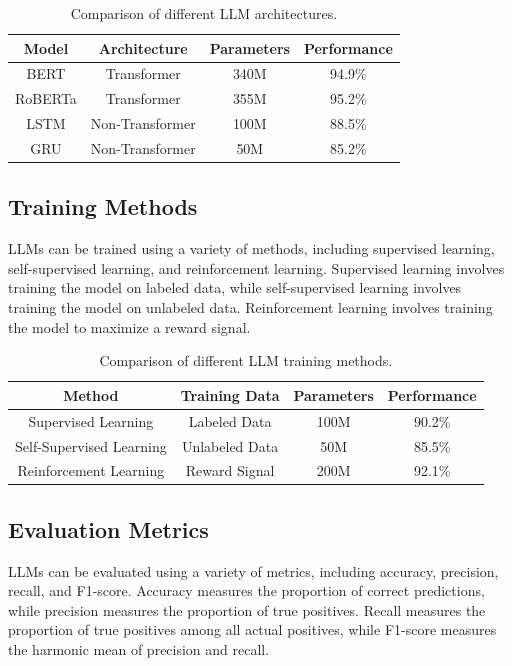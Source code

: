 \documentclass{article}
\begin{document}
\begin{table}[h]
\centering
\begin{tabular}{|c|c|c|c|}
\hline
Model & Architecture & Parameters & Performance \\
\hline
BERT & Transformer & 340M & 94.9\% \\
\hline
RoBERTa & Transformer & 355M & 95.2\% \\
\hline
LSTM & Non-Transformer & 100M & 88.5\% \\
\hline
GRU & Non-Transformer & 50M & 85.2\% \\
\hline
\end{tabular}
\caption{Comparison of different LLM architectures.}
\label{table:architectures}
\end{table}

\subsection{Training Methods}

LLMs can be trained using a variety of methods, including supervised learning, self-supervised learning, and reinforcement learning. Supervised learning involves training the model on labeled data, while self-supervised learning involves training the model on unlabeled data. Reinforcement learning involves training the model to maximize a reward signal.

\begin{table}[h]
\centering
\begin{tabular}{|c|c|c|c|}
\hline
Method & Training Data & Parameters & Performance \\
\hline
Supervised Learning & Labeled Data & 100M & 90.2\% \\
\hline
Self-Supervised Learning & Unlabeled Data & 50M & 85.5\% \\
\hline
Reinforcement Learning & Reward Signal & 200M & 92.1\% \\
\hline
\end{tabular}
\caption{Comparison of different LLM training methods.}
\label{table:training_methods}
\end{table}

\subsection{Evaluation Metrics}

LLMs can be evaluated using a variety of metrics, including accuracy, precision, recall, and F1-score. Accuracy measures the proportion of correct predictions, while precision measures the proportion of true positives. Recall measures the proportion of true positives among all actual positives, while F1-score measures the harmonic mean of precision and recall.
\end{document}
